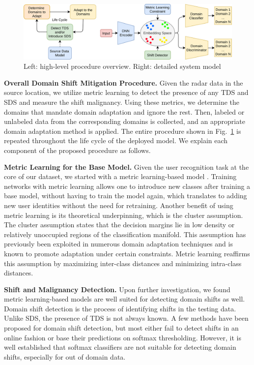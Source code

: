 \documentclass{article}
\begin{document}
\begin{figure}[ht]
\includegraphics[width=1.0\linewidth]{figures/Arch.png} 
\caption{Left: high-level procedure overview. Right: detailed system model}
\label{arch}
\end{figure}

\textbf{Overall Domain Shift Mitigation Procedure.} Given the radar data in the source location, we utilize metric learning to detect the presence of any TDS and SDS and measure the shift malignancy. Using these metrics, we determine the domains that mandate domain adaptation and ignore the rest. Then, labeled or unlabeled data from the corresponding domains is collected, and an appropriate domain adaptation method is applied. The entire procedure shown in Fig.~\ref{arch} is repeated throughout the life cycle of the deployed model. We explain each component of the proposed procedure as follows.

\textbf{Metric Learning for the Base Model.} Given the user recognition task at the core of our dataset, we started with a metric learning-based model \cite{kaya2019deep}. Training networks with metric learning allows one to introduce new classes after training a base model, without having to train the model again, which translates to adding new user identities without the need for retraining. Another benefit of using metric learning is its theoretical underpinning, which is the cluster assumption. The cluster assumption states that the decision margins lie in low density or relatively unoccupied regions of the classification manifold. This assumption has previously been exploited in numerous domain adaptation techniques and is known to promote adaptation under certain constraints. Metric learning reaffirms this assumption by maximizing inter-class distances and minimizing intra-class distances.

\textbf{Shift and Malignancy Detection.} Upon further investigation, we found metric learning-based models are well suited for detecting domain shifts as well. Domain shift detection is the process of identifying shifts in the testing data. Unlike SDS, the presence of TDS is not always known. A few methods have been proposed for domain shift detection, but most either fail to detect shifts in an online fashion \cite{lipton2018detecting, rabanser2019failing} or base their predictions on softmax thresholding. However, it is well established that \cite{gal2016dropout, snoek2019can} softmax classifiers are not suitable for detecting domain shifts, especially for out of domain data. 
\end{document}
